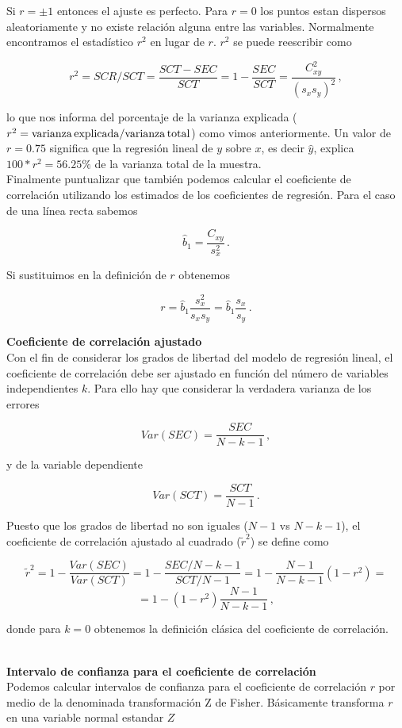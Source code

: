 \documentclass[
]{agujournal2019}
\begin{document}
\noindent Si \(r=\pm1\) entonces el ajuste es perfecto. Para \(r=0\) los
puntos estan dispersos aleatoriamente y no existe relación alguna entre
las variables. Normalmente encontramos el estadístico \(r^2\) en lugar
de \(r\). \(r^2\) se puede reescribir como

\[r^2=SCR/SCT=\frac{SCT-SEC}{SCT}=1-\frac{SEC}{SCT}=\frac{C^2_{xy}}{(s_x s_y)^2}\,,\]

lo que nos informa del porcentaje de la varianza explicada
(\(r^2={\rm varianza\,explicada}/{\rm varianza\,total}\)) como vimos
anteriormente. Un valor de \(r=0.75\) significa que la regresión lineal
de \(y\) sobre \(x\), es decir \(\hat{y}\), explica \(100*r^2=56.25\%\)
de la varianza total de la muestra.\\
\noindent Finalmente puntualizar que también podemos calcular el
coeficiente de correlación utilizando los estimados de los coeficientes
de regresión. Para el caso de una línea recta sabemos

\[\hat{b}_1=\frac{C_{xy}}{s^2_x}\,.\]

Si sustituimos en la definición de \(r\) obtenemos

\[r=\hat{b}_1\frac{s^2_x}{s_x s_y}=\hat{b}_1\frac{s_x}{s_y}\,.\]

\textbf{Coeficiente de correlación ajustado}\\

Con el fin de considerar los grados de libertad del modelo de regresión
lineal, el coeficiente de correlación debe ser ajustado en función del
número de variables independientes \(k\). Para ello hay que considerar
la verdadera varianza de los errores

\[Var(SEC)=\frac{SEC}{N-k-1}\,,\]

y de la variable dependiente

\[Var(SCT)=\frac{SCT}{N-1}\,.\]

Puesto que los grados de libertad no son iguales (\(N-1\) vs \(N-k-1\)),
el coeficiente de correlación ajustado al cuadrado (\(\tilde{r}^2\)) se
define como

\[\tilde{r}^2=1-\frac{Var(SEC)}{Var(SCT)}=1-\frac{SEC/N-k-1}{SCT/N-1}=
1-\frac{N-1}{N-k-1}(1-r^2)=\] \[=1-(1-r^2)\frac{N-1}{N-k-1}\,,\]

donde para \(k=0\) obtenemos la definición clásica del coeficiente de
correlación.\\
\strut \\
\textbf{Intervalo de confianza para el coeficiente de correlación}\\
Podemos calcular intervalos de confianza para el coeficiente de
correlación \(r\) por medio de la denominada transformación Z de Fisher.
Básicamente transforma \(r\) en una variable normal estandar \(Z\)
\end{document}
